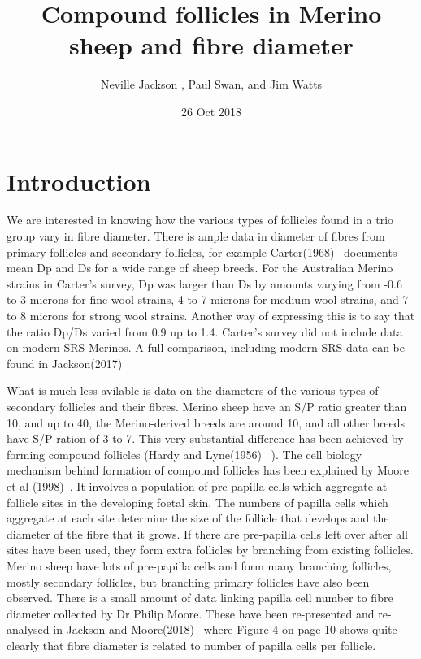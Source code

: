 \documentclass[titlepage]{article}  %
\title{ Compound follicles in Merino sheep and fibre diameter}
\author{Neville Jackson , Paul Swan, and Jim Watts}
\date{26 Oct 2018}
\begin{document}
 
 
\maketitle      
\tableofcontents


\clearpage
\section{Introduction} 
We are interested in knowing how the various types of follicles found in a trio group vary in fibre diameter. There is ample data in diameter of fibres from primary follicles and secondary follicles, for example Carter(1968)~\cite{cart:68} documents mean Dp and Ds for a wide range of sheep breeds. For the Australian Merino strains in Carter's survey, Dp was larger than Ds by amounts varying from -0.6 to 3 microns for fine-wool strains, 4 to 7 microns for medium wool strains, and 7 to 8 microns for strong wool strains. Another way of expressing this is to say that the ratio Dp/Ds varied from 0.9 up to 1.4. Carter's survey did not include data on modern SRS Merinos. A full comparison, including modern SRS data can be found in Jackson(2017)~\cite{jack:17b}

What is much less avilable is data on the diameters of the various types of secondary follicles and their fibres.  Merino sheep have an S/P ratio greater than 10, and up to 40, the Merino-derived breeds are around 10, and all other breeds have S/P ration of 3 to 7. This very substantial difference has been achieved by forming compound follicles (Hardy and Lyne(1956)~\cite{hard:56} ). The cell biology mechanism behind formation of compound follicles has been explained by Moore et al (1998)~\cite{moor:98}. It involves a population of pre-papilla cells which aggregate at follicle sites in the developing foetal skin. The numbers of papilla cells which aggregate at each site determine the size of the follicle that develops and the diameter of the fibre that it grows. If there are pre-papilla cells left over after all sites have been used, they form extra follicles by branching from existing follicles. Merino sheep have lots of pre-papilla cells and form many branching follicles, mostly secondary follicles, but branching primary follicles have also been observed. There is a small amount of data linking papilla cell number to fibre diameter collected by Dr Philip Moore. These have been re-presented and re-analysed in Jackson and Moore(2018)~\cite{jamo:18} where Figure 4 on page 10 shows quite clearly that fibre diameter is related to number of papilla cells per follicle.
\end{document}
